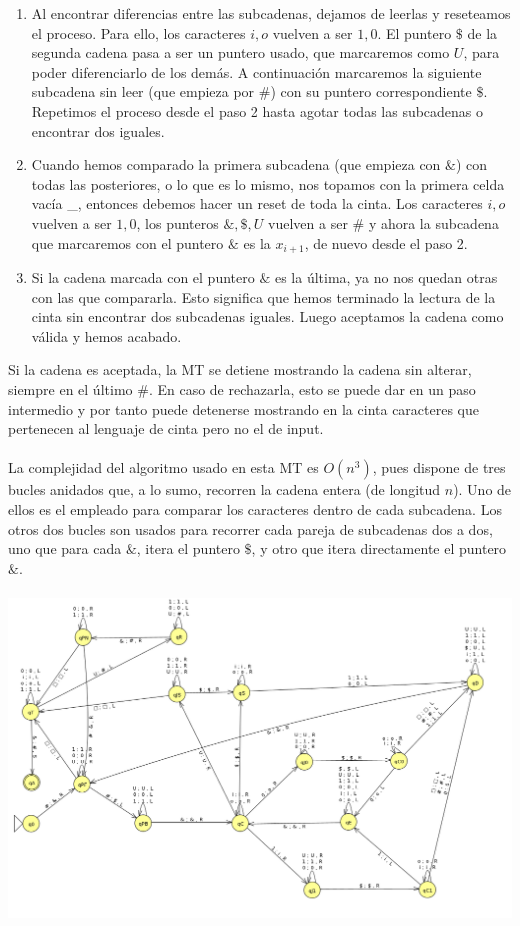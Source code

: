 \documentclass[11pt, a4paper]{exam}
\begin{document}
\begin{questions}
\begin{parts}
\begin{solution}
\begin{enumerate}
                \item Al encontrar diferencias entre las subcadenas, dejamos de leerlas y reseteamos el proceso. Para ello, los caracteres $i,o$ vuelven a ser $1,0$. El puntero $\$$ de la segunda cadena pasa a ser un puntero usado, que marcaremos como $U$, para poder diferenciarlo de los demás. A continuación marcaremos la siguiente subcadena sin leer (que empieza por $\#$) con su puntero correspondiente $\$$. Repetimos el proceso desde el paso 2 hasta agotar todas las subcadenas o encontrar dos iguales.
                \item Cuando hemos comparado la primera subcadena (que empieza con $\&$) con todas las posteriores, o lo que es lo mismo, nos topamos con la primera celda vacía \_, entonces debemos hacer un reset de toda la cinta. Los caracteres $i,o$ vuelven a ser $1,0$, los punteros $\&,\$,U$ vuelven a ser $\#$ y ahora la subcadena que marcaremos con el puntero $\&$ es la $x_{i+1}$, de nuevo desde el paso 2.
                \item Si la cadena marcada con el puntero $\&$ es la última, ya no nos quedan otras con las que compararla. Esto significa que hemos terminado la lectura de la cinta sin encontrar dos subcadenas iguales. Luego aceptamos la cadena como válida y hemos acabado.
            \end{enumerate}
            Si la cadena es aceptada, la MT se detiene mostrando la cadena sin alterar, siempre en el último $\#$. En caso de rechazarla, esto se puede dar en un paso intermedio y por tanto puede detenerse mostrando en la cinta caracteres que pertenecen al lenguaje de cinta pero no el de input.
            \\
            \\
            La complejidad del algoritmo usado en esta MT es $O(n^3)$, pues dispone de tres bucles anidados que, a lo sumo, recorren la cadena entera (de longitud $n$). Uno de ellos es el empleado para comparar los caracteres dentro de cada subcadena. Los otros dos bucles son usados para recorrer cada pareja de subcadenas dos a dos, uno que para cada $\&$, itera el puntero $\$$, y otro que itera directamente el puntero $\&$.
            \\
            \\
            \includegraphics[width = 15 cm]{figs/M4Unicinta.png}

\end{solution}
\end{parts}
\end{questions}
\end{document}
